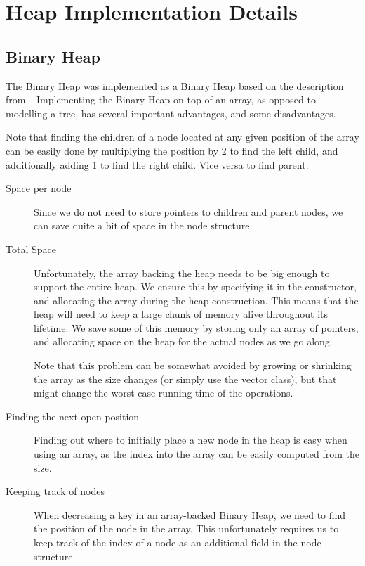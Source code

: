 \section{Heap Implementation Details}

\subsection{Binary Heap}

The Binary Heap was implemented as a Binary Heap based on the description from~\cite{AlgInC}.
Implementing the Binary Heap on top of an array, as opposed to modelling a tree, has several important advantages, and some disadvantages.

Note that finding the children of a node located at any given position of the array can be easily done by multiplying the position by 2 to find the left child, and additionally adding 1 to find the right child. Vice versa to find parent.

\begin{description}

\item[Space per node] Since we do not need to store pointers to children and parent nodes, we can save quite a bit of space in the node structure.

\item[Total Space] Unfortunately, the array backing the heap needs to be big enough to support the entire heap. We ensure this by specifying it in the constructor, and allocating the array during the heap construction. This means that the heap will need to keep a large chunk of memory alive throughout its lifetime. We save some of this memory by storing only an array of pointers, and allocating space on the heap for the actual nodes as we go along.

Note that this problem can be somewhat avoided by growing or shrinking the array as the size changes (or simply use the vector class), but that might change the worst-case running time of the operations.

\item[Finding the next open position] Finding out where to initially place a new node in the heap is easy when using an array, as the index into the array can be easily computed from the size.

\item[Keeping track of nodes] When decreasing a key in an array-backed Binary Heap, we need to find the position of the node in the array. This unfortunately requires us to keep track of the index of a node as an additional field in the node structure.

\end{description}

